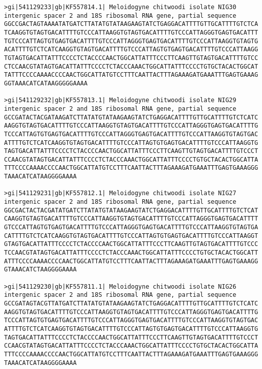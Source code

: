 \documentclass[11pt]{article}
\begin{document}
\begin{Verbatim}[commandchars=\\\{\}]
>gi|541129233|gb|KF557814.1| Meloidogyne chitwoodi isolate NIG30 intergenic spacer 2 and 18S ribosomal RNA gene, partial sequence
GGCCGACTAGTAAAATATGATCTTATATGTATAAGAAGTATCTGAGGACATTTTGTTGCATTTTGTCTCA
TCAAGGTGTAGTGACATTTTGTCCCATTAAGGTGTAGTGACATTTTGTCCCATTAGGGTGAGTGACATTT
TGTCCCATTAGTGTGAGTGACATTTTGTCCCATTAGGGTGAGTGACATTTTGTCCCATTAAGGTGTAGTG
ACATTTTGTCTCATCAAGGTGTAGTGACATTTTGTCCCATTAGTGTGAGTGACATTTTGTCCCATTAAGG
TGTAGTGACATTATTTCCCCTCTACCCCAACTGGCATTATTTCCCTTCAAGTTGTAGTGACATTTTGTCC
CTCCAACGTATAGTGACATTATTTCCCCTCTACCCAAACTGGCATTATTTCCCCTGTGCTACACTGGCAT
TATTTCCCCAAAACCCCAACTGGCATTATGTCCTTTCAATTACTTTAGAAAGATGAAATTTGAGTGAAAG
GGTAAACATCATAAGGGGGAAAA

>gi|541129232|gb|KF557813.1| Meloidogyne chitwoodi isolate NIG29 intergenic spacer 2 and 18S ribosomal RNA gene, partial sequence
GCCGATACTACGATAAGATCTTATATGTATAAGAAGTATCTGAGGACATTTTGTTGCATTTTGTCTCATC
AAGGTGTAGTGACATTTTGTCCCATTAAGGTGTAGTGACATTTTGTCCCATTAGGGTGAGTGACATTTTG
TCCCATTAGTGTGAGTGACATTTTGTCCCATTAGGGTGAGTGACATTTTGTCCCATTAAGGTGTAGTGAC
ATTTTGTCTCATCAAGGTGTAGTGACATTTTGTCCCATTAGTGTGAGTGACATTTTGTCCCATTAAGGTG
TAGTGACATTATTTCCCCTCTACCCCAACTGGCATTATTTCCCTTCAAGTTGTAGTGACATTTTGTCCCT
CCAACGTATAGTGACATTATTTCCCCTCTACCCAAACTGGCATTATTTCCCCTGTGCTACACTGGCATTA
TTTCCCCAAAACCCCAACTGGCATTATGTCCTTTCAATTACTTTAGAAAGATGAAATTTGAGTGAAAGGG
TAAACATCATAAGGGGAAAA

>gi|541129231|gb|KF557812.1| Meloidogyne chitwoodi isolate NIG27 intergenic spacer 2 and 18S ribosomal RNA gene, partial sequence
GGCGACTACTACGATATGATCTTATATGTATAAGAAGTATCTGAGGACATTTTGTTGCATTTTGTCTCAT
CAAGGTGTAGTGACATTTTGTCCCATTAAGGTGTAGTGACATTTTGTCCCATTAGGGTGAGTGACATTTT
GTCCCATTAGTGTGAGTGACATTTTGTCCCATTAGGGTGAGTGACATTTTGTCCCATTAAGGTGTAGTGA
CATTTTGTCTCATCAAGGTGTAGTGACATTTTGTCCCATTAGTGTGAGTGACATTTTGTCCCATTAAGGT
GTAGTGACATTATTTCCCCTCTACCCCAACTGGCATTATTTCCCTTCAAGTTGTAGTGACATTTTGTCCC
TCCAACGTATAGTGACATTATTTCCCCTCTACCCAAACTGGCATTATTTCCCCTGTGCTACACTGGCATT
ATTTCCCCAAAACCCCAACTGGCATTATGTCCTTTCAATTACTTTAGAAAGATGAAATTTGAGTGAAAGG
GTAAACATCTAAGGGGAAAA

>gi|541129230|gb|KF557811.1| Meloidogyne chitwoodi isolate NIG26 intergenic spacer 2 and 18S ribosomal RNA gene, partial sequence
GCCGATAGTACGTTATGATCTTATATGTATAAGAAGTATCTGAGGACATTTTGTTGCATTTTGTCTCATC
AAGGTGTAGTGACATTTTGTCCCATTAAGGTGTAGTGACATTTTGTCCCATTAGGGTGAGTGACATTTTG
TCCCATTAGTGTGAGTGACATTTTGTCCCATTAGGGTGAGTGACATTTTGTCCCATTAAGGTGTAGTGAC
ATTTTGTCTCATCAAGGTGTAGTGACATTTTGTCCCATTAGTGTGAGTGACATTTTGTCCCATTAAGGTG
TAGTGACATTATTTCCCCTCTACCCCAACTGGCATTATTTCCCTTCAAGTTGTAGTGACATTTTGTCCCT
CCAACGTATAGTGACATTATTTCCCCTCTACCCAAACTGGCATTATTTCCCCTGTGCTACACTGGCATTA
TTTCCCCAAAACCCCAACTGGCATTATGTCCTTTCAATTACTTTAGAAAGATGAAATTTGAGTGAAAGGG
TAAACATCATAAGGGGAAAA


\end{Verbatim}
\end{document}
